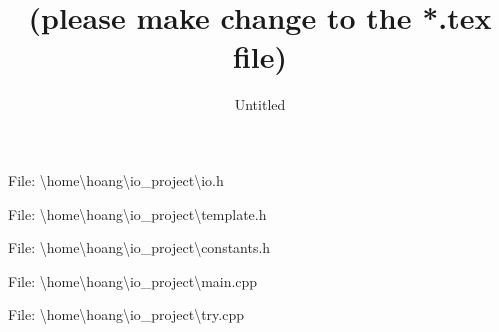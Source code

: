 \documentclass[11pt, , a4paper]{article}
\title{(please make change to the *.tex file)}
\author{Untitled}
\begin{document}
\lstlistoflistings
\maketitle
File: \textbackslash home\textbackslash hoang\textbackslash io\_project\textbackslash io.h

\clearpage
File: \textbackslash home\textbackslash hoang\textbackslash io\_project\textbackslash template.h

\clearpage
File: \textbackslash home\textbackslash hoang\textbackslash io\_project\textbackslash constants.h

\clearpage
File: \textbackslash home\textbackslash hoang\textbackslash io\_project\textbackslash main.cpp

\clearpage
File: \textbackslash home\textbackslash hoang\textbackslash io\_project\textbackslash try.cpp

\clearpage
\end{document}
